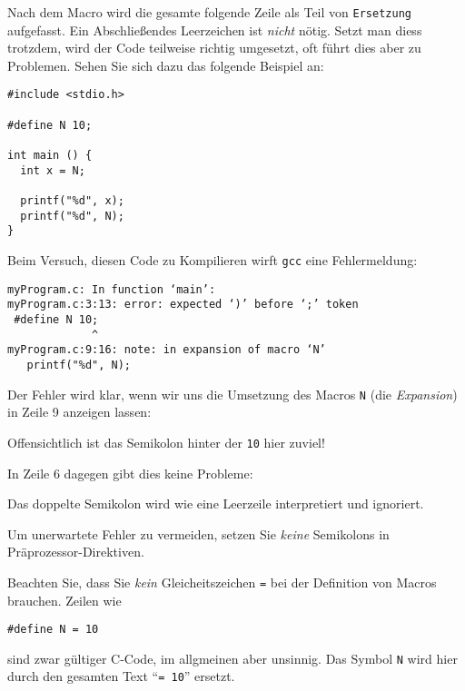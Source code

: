 \begin{warnbox}
Nach dem Macro wird die gesamte folgende Zeile als Teil von \texttt{Ersetzung} aufgefasst. Ein Abschließendes Leerzeichen ist \emph{nicht} nötig. Setzt man diess trotzdem, wird der Code teilweise richtig umgesetzt, oft führt dies aber zu Problemen. Sehen Sie sich dazu das folgende Beispiel an:

\begin{codebox}
\begin{verbatim}
#include <stdio.h>

#define N 10;

int main () {
  int x = N;
  
  printf("%d", x);
  printf("%d", N);
}
\end{verbatim}
\end{codebox}

Beim Versuch, diesen Code zu Kompilieren wirft \texttt{gcc} eine Fehlermeldung:

\begin{cmdbox}
\begin{verbatim}
myProgram.c: In function ‘main’:
myProgram.c:3:13: error: expected ‘)’ before ‘;’ token
 #define N 10;
             ^
myProgram.c:9:16: note: in expansion of macro ‘N’
   printf("%d", N);
\end{verbatim}
\end{cmdbox}

Der Fehler wird klar, wenn wir uns die Umsetzung des Macros \texttt{N} (die \emph{Expansion}) in Zeile 9 anzeigen lassen:

Offensichtlich ist das Semikolon hinter der \texttt{10} hier zuviel!

In Zeile 6 dagegen gibt dies keine Probleme:
\begin{codebox}
\end{codebox}
Das doppelte Semikolon wird wie eine Leerzeile interpretiert und ignoriert.

Um unerwartete Fehler zu vermeiden, setzen Sie \emph{keine} Semikolons in Präprozessor-Direktiven.
\end{warnbox}

\begin{warnbox}
Beachten Sie, dass Sie \emph{kein} Gleicheitszeichen \texttt{=} bei der Definition von Macros brauchen. Zeilen wie

\begin{center}
\texttt{#define N = 10}
\end{center}

sind zwar gültiger C-Code, im allgmeinen aber unsinnig. Das Symbol \texttt{N} wird hier durch den gesamten Text \enquote{\texttt{= 10}} ersetzt.
\end{warnbox}

